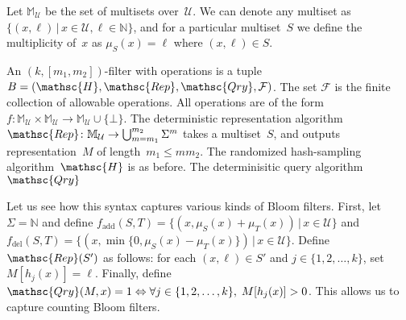 Let $\mathbb{M}_\mathcal{U}$ be the set of multisets over~$\mathcal{U}$.  We can denote any multiset as $\{(x,\ell) \,|\, x \in \mathcal{U}, \ell \in \mathbb{N}\}$, and for a particular multiset~$S$ we define the multiplicity of~$x$ as $\mu_S(x) = \ell$ where $(x,\ell)\in S$.

An $(k,[m_1,m_2])$-filter with operations is a tuple  $B=(\mathsc{H},\mathsc{Rep},\mathsc{Qry}, \mathcal{F})$.  
The set $\mathcal{F}$ is the finite collection of allowable operations.  All operations are of the form 
$f: \mathbb{M}_{\mathcal{U}} \times \mathbb{M}_{\mathcal{U}} \rightarrow \mathbb{M}_{\mathcal{U}} \cup \{\bot\}$.  
%
The deterministic representation algorithm $\mathsc{Rep}\colon \mathbb{M}_\mathcal{U} \rightarrow \bigcup_{m=m_1}^{m_2}\Sigma^m$ takes a multiset~$S$, and outputs representation~$M$ of length~$m_1 \leq m m_2$.   
%
The randomized hash-sampling algorithm~$\mathsc{H}$ is as before.
%
The determinisitic query algorithm $\mathsc{Qry}$ 


Let us see how this syntax captures various kinds of Bloom filters.  First, let $\Sigma = \mathbb{N}$ and define $f_{\mathrm{add}}(S,T)=\{(x,\mu_S(x)+\mu_T(x)) \,|\, x \in \mathcal{U}\}$ and $f_\mathrm{del}(S,T) = \{(x,\min\{0,\mu_S(x)-\mu_T(x)\}) \,|\, x \in \mathcal{U} \}$.  Define $\mathsc{Rep}(S')$ as follows: for each $(x,\ell)\in S'$ and $j\in\{1,2,\ldots,k\}$, set $M[h_j(x)]=\ell$.   Finally, define $\mathsc{Qry}(M,x) = 1 \Leftrightarrow \forall j \in \{1,2,\ldots,k\},\; M[h_j(x)] > 0$.  This allows us to capture counting Bloom filters. 

